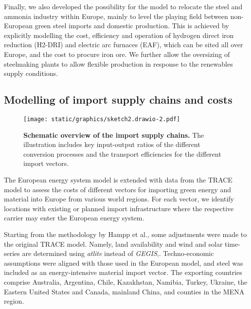 \documentclass[5p,9pt,draft]{elsarticle}
\providecommand{\DIFaddbeginFL}{} %
\providecommand{\DIFaddendFL}{} %
\providecommand{\DIFdelbeginFL}{} %
\providecommand{\DIFdelendFL}{} %
\newcommand{\DIFscaledelfig}{0.5}
\newlength{\DIFdelgraphicswidth} %
\newlength{\DIFdelgraphicsheight} %
\newcommand{\DIFaddincludegraphics}[2][]{{\color{blue}\fbox{\DIFOincludegraphics[#1]{#2}}}} %
\newcommand{\DIFdelincludegraphics}[2][]{%
\sbox{\DIFdelgraphicsbox}{\DIFOincludegraphics[#1]{#2}}%
\settoboxwidth{\DIFdelgraphicswidth}{\DIFdelgraphicsbox} %
\settoboxtotalheight{\DIFdelgraphicsheight}{\DIFdelgraphicsbox} %
\scalebox{\DIFscaledelfig}{%
\parbox[b]{\DIFdelgraphicswidth}{\usebox{\DIFdelgraphicsbox}\\[-\baselineskip] \rule{\DIFdelgraphicswidth}{0em}}\llap{\resizebox{\DIFdelgraphicswidth}{\DIFdelgraphicsheight}{%
\setlength{\unitlength}{\DIFdelgraphicswidth}%
\begin{picture}(1,1)%
\thicklines\linethickness{2pt} %
{\color[rgb]{1,0,0}\put(0,0){\framebox(1,1){}}}%
{\color[rgb]{1,0,0}\put(0,0){\line( 1,1){1}}}%
{\color[rgb]{1,0,0}\put(0,1){\line(1,-1){1}}}%
\end{picture}%
}\hspace*{3pt}}} %
} %
\DeclareRobustCommand{\DIFaddbeginFL}{\DIFOaddbeginFL \let\includegraphics\DIFaddincludegraphics} %
\DeclareRobustCommand{\DIFaddendFL}{\DIFOaddendFL \let\includegraphics\DIFOincludegraphics} %
\DeclareRobustCommand{\DIFdelbeginFL}{\DIFOdelbeginFL \let\includegraphics\DIFdelincludegraphics} %
\DeclareRobustCommand{\DIFdelendFL}{\DIFOaddendFL \let\includegraphics\DIFOincludegraphics} %
\begin{document}
Finally, we also developed the possibility for the model to relocate the steel
and ammonia industry within Europe, mainly to level the playing field between
non-European green steel imports and domestic production. This is achieved by
explicitly modelling the cost, efficiency and operation of hydrogen direct iron
reduction (H2-DRI) and electric arc furnaces (EAF), which can be sited all over
Europe, and the cost to procure iron ore. We further allow the oversizing of
steelmaking plants to allow flexible production in response to the renewables
supply conditions.

\subsection*{Modelling of import supply chains and costs}

\begin{figure*}
    \centering
    \DIFdelbeginFL %
\DIFdelendFL \DIFaddbeginFL \texttt{[image: static/graphics/sketch2.drawio-2.pdf]}
    \DIFaddendFL \caption{\textbf{Schematic overview of the import supply chains.} The
    illustration includes key input-output ratios of the different conversion
    processes and the transport efficiencies for the different import vectors.}
    \label{fig:import-esc-scheme}
\end{figure*}

The European energy system model is extended with data from the TRACE model
\cite{hamppImportOptions2023} to assess the costs of different vectors for
importing green energy and material into Europe from various world regions. For
each vector, we identify locations with existing or planned import
infrastructure where the respective carrier may enter the European energy
system.

Starting from the methodology by Hampp et al.\cite{hamppImportOptions2023}, some
adjustments were made to the original TRACE model. Namely, land availability and
wind and solar time-series are determined using
\textit{atlite}\cite{hofmannAtliteLightweight2021} instead of
\textit{GEGIS},\cite{mattssonAutopilotEnergy2021}. Techno-economic assumptions
were aligned with those used in the European model, and steel was included as an
energy-intensive material import vector. The exporting countries comprise
Australia, Argentina, Chile, Kazakhstan, Namibia, Turkey, Ukraine, the Eastern
United States and Canada, mainland China, and counties in the MENA region.
\end{document}
